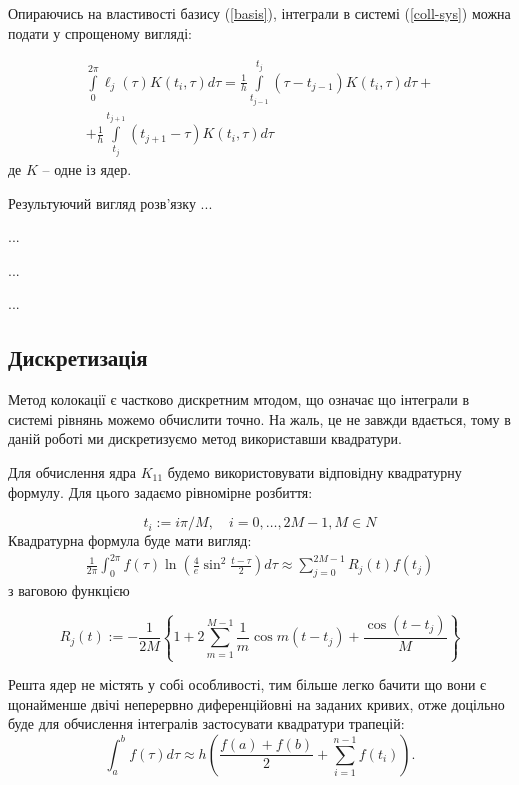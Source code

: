 \documentclass[14pt,a4paper]{extarticle}
\newcounter{e}
\numberwithin{equation}{section}
\numberwithin{figure}{section}
\newcommand{\intl}{\int\limits}
\newcommand{\inttwopi}{\intl_{0}^{2\pi}}
\begin{document}
 Опираючись на властивості базису (\ref{basis}), інтеграли в системі (\ref{coll-sys}) можна подати у спрощеному вигляді:
 
 \begin{equation}
 	\begin{matrix}
 	\displaystyle
 	\inttwopi \ell_{j}(\tau) K\left(t_{i}, \tau\right) d \tau=\frac{1}{h} \intl_{t_{j-1}}^{t_{j}}\left(\tau-t_{j-1}\right) K\left(t_{i}, \tau\right) d \tau + \\
 	\displaystyle
 	+\frac{1}{h} \intl_{t_{j}}^{t_{j+1}}\left(t_{j+1}-\tau\right) K\left(t_{i}, \tau\right) d \tau
 	\end{matrix}
 \end{equation}
 де $K$ -- одне із ядер.
 
 Результуючий вигляд розв'язку ...
 
 ...
 
 ...
 
 ...
 
 
 \subsection{Дискретизація}
 Метод колокації є частково дискретним мтодом, що означає що інтеграли в системі рівнянь можемо обчислити точно. На жаль, це не завжди вдається, тому в даній роботі ми дискретизуємо метод використавши квадратури.

Для обчислення ядра $K_{11}$ будемо використовувати відповідну квадратурну формулу. Для цього задаємо рівномірне розбиття:

$$
t_{i}:=i \pi / M, \quad i=0, \ldots, 2 M-1, M \in N
$$
Квадратурна формула буде мати вигляд:
\begin{eqnarray}
	\frac{1}{2 \pi} \int_{0}^{2 \pi} f(\tau) \ln \left(\frac{4}{e} \sin ^{2} \frac{t-\tau}{2}\right) d \tau \approx \sum_{j=0}^{2 M-1} R_{j}(t) f\left(t_{j}\right)
\end{eqnarray}
з ваговою функцією

\begin{equation}
	R_{j}(t):=-\frac{1}{2 M}\left\{1+2 \sum_{m=1}^{M-1} \frac{1}{m} \cos m\left(t-t_{j}\right)+\frac{\cos \left(t-t_{j}\right)}{M}\right\}
\end{equation} 

 Решта ядер не містять у собі особливості, тим більше легко бачити що вони є щонайменше двічі неперервно диференційовні на заданих кривих, отже доцільно буде для обчислення інтегралів застосувати квадратури трапецій:
 \begin{equation}
 	\displaystyle
 	\int_{a}^{b} f(\tau) d \tau \approx h \left(\frac{f(a)+f(b)}{2}+\sum_{i=1}^{n-1} f\left(t_{i}\right)\right).
 \end{equation}
 
\end{document}
